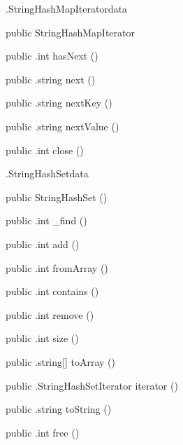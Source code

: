 \begin{CrexxClass}{.StringHashMapIterator}{data}

  \begin{Hierarchy}
  \end{Hierarchy}

  \begin{Members}

    \Factory
      {public}
      {StringHashMapIterator}
      {}

    \Method
      {public}
      {.int}
      {hasNext}
      {()}

    \Method
      {public}
      {.string}
      {next}
      {()}

    \Method
      {public}
      {.string}
      {nextKey}
      {()}

    \Method
      {public}
      {.string}
      {nextValue}
      {()}

    \Method
      {public}
      {.int}
      {close}
      {()}

  \end{Members}
\end{CrexxClass}

\begin{CrexxClass}{.StringHashSet}{data}

  \begin{Hierarchy}
  \end{Hierarchy}

  \begin{Members}

    \Factory
      {public}
      {StringHashSet}
      {()}

    \Method
      {public}
      {.int}
      {\_find}
      {()}

    \Method
      {public}
      {.int}
      {add}
      {()}

    \Method
      {public}
      {.int}
      {fromArray}
      {()}

    \Method
      {public}
      {.int}
      {contains}
      {()}

    \Method
      {public}
      {.int}
      {remove}
      {()}

    \Method
      {public}
      {.int}
      {size}
      {()}

    \Method
      {public}
      {.string[]}
      {toArray}
      {()}

    \Method
      {public}
      {.StringHashSetIterator}
      {iterator}
      {()}

    \Method
      {public}
      {.string}
      {toString}
      {()}

    \Method
      {public}
      {.int}
      {free}
      {()}

  \end{Members}
\end{CrexxClass}

